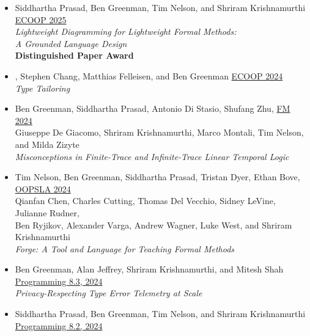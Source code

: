 \documentclass[11pt]{article}
\begin{document}
\begin{itemize}
    \emph{A Misconception-Driven Adaptive Tutor for Linear Temporal Logic} \hfill {}
    {\\\textbf{Distinguished Paper Award}}
\item
  Siddhartha Prasad, Ben Greenman, Tim Nelson, and Shriram Krishnamurthi \hfill \href{https://2025.ecoop.org/}{ECOOP 2025} \\
    \emph{Lightweight Diagramming for Lightweight Formal Methods:} \hfill {}
    \\\emph{A Grounded Language Design}
    {\\\textbf{Distinguished Paper Award}}
\item
  , Stephen Chang, Matthias Felleisen, and Ben Greenman \hfill \href{https://2024.ecoop.org/}{ECOOP 2024} \\
    \emph{Type Tailoring} \hfill {}
\item
  Ben Greenman, Siddhartha Prasad, Antonio Di Stasio, Shufang Zhu, \hfill \href{https://www.fm24.polimi.it/}{FM 2024} \\
  Giuseppe De Giacomo, Shriram Krishnamurthi, Marco Montali, Tim Nelson, and Milda Zizyte \\
    \emph{Misconceptions in Finite-Trace and Infinite-Trace Linear Temporal Logic} \hfill {}
\item
  {Tim Nelson}, {Ben Greenman}, {Siddhartha Prasad}, {Tristan Dyer}, {Ethan Bove},
    \hfill \href{https://2024.splashcon.org/track/splash-2024-oopsla}{OOPSLA 2024} \\
  {Qianfan Chen}, {Charles Cutting}, {Thomas Del Vecchio}, {Sidney LeVine}, {Julianne Rudner}, \\
  {Ben Ryjikov}, {Alexander Varga}, {Andrew Wagner}, {Luke West}, and {Shriram Krishnamurthi} \\
    \emph{Forge: A Tool and Language for Teaching Formal Methods} \hfill {} %
\item
  Ben Greenman, Alan Jeffrey, Shriram Krishnamurthi, and Mitesh Shah \hfill \href{https://2024.programming-conference.org/}{Programming 8.3, 2024} \\
  \emph{Privacy-Respecting Type Error Telemetry at Scale} \hfill {}
\item
  Siddhartha Prasad, Ben Greenman, Tim Nelson, and Shriram Krishnamurthi \hfill \href{https://2024.programming-conference.org/}{Programming 8.2, 2024} \\

\end{itemize}
\end{document}
